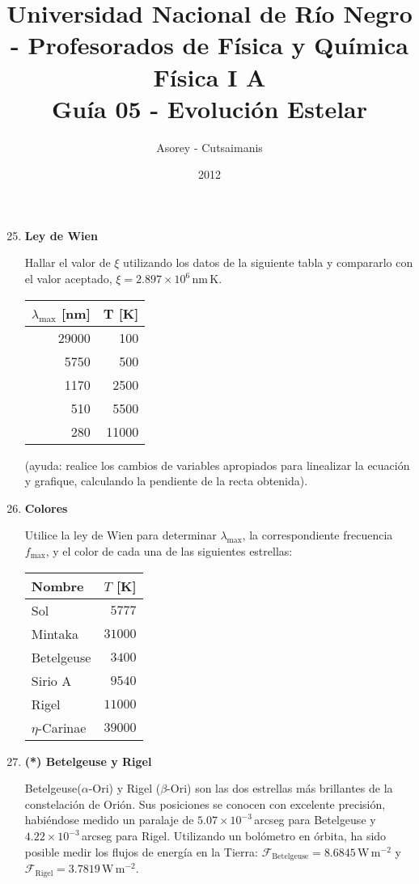 \documentclass[a4paper,12pt]{article}
\begin{document}
\title{
{\normalsize{Universidad Nacional de Río Negro - Profesorados de Física y
Química}}\\ Física I A \\ Guía 05 - Evolución Estelar}
\author{Asorey - Cutsaimanis}
\date{2012}
\maketitle

\begin{enumerate}
\setcounter{enumi}{24}      %

\item{\bf{Ley de Wien}}

Hallar el valor de $\xi$ utilizando los datos de la siguiente tabla y
compararlo con el valor aceptado, $\xi = 2.897 \times 10^6$\,nm\,K.

\begin{tabular}{ r | r }
$\lambda_{\max}$ [nm] & T [K]\\
\hline
29000 & 100 \\
5750 & 500 \\
1170 & 2500 \\
510 & 5500 \\
280 & 11000
\end{tabular}
(ayuda: realice los cambios de variables apropiados para linealizar la ecuación
y grafique, calculando la pendiente de la recta obtenida).

\item{\bf{Colores}}

Utilice la ley de Wien para determinar $\lambda_{\max}$, la correspondiente
frecuencia $f_{\max}$, y el color de cada una de las siguientes estrellas: 

\begin{tabular}{ l | r }
Nombre & $T$ [K] \\
\hline
Sol & $5777$ \\
Mintaka & $31000$ \\
Betelgeuse & $3400$ \\
Sirio A & $9540$ \\
Rigel & $11000$ \\
$\eta$-Carinae & $39000$
\end{tabular}

\item{\bf{(*) Betelgeuse y Rigel}}

Betelgeuse($\alpha$-Ori) y Rigel ($\beta$-Ori) son las dos estrellas más
brillantes de la constelación de Orión. Sus posiciones se conocen con excelente
precisión, habiéndose medido un paralaje de $5.07\times10^{-3}$\,arcseg para
Betelgeuse y  $4.22\times10^{-3}$\,arcseg para Rigel. Utilizando un bolómetro
en órbita, ha sido posible medir los flujos de energía en la Tierra:
$\mathcal{F}_{\mathrm{Betelgeuse}} = 8.6845$\,W\,m$^{-2}$ y
$\mathcal{F}_{\mathrm{Rigel}} = 3.7819$\,W\,m$^{-2}$.
 

\end{enumerate}
\end{document}
